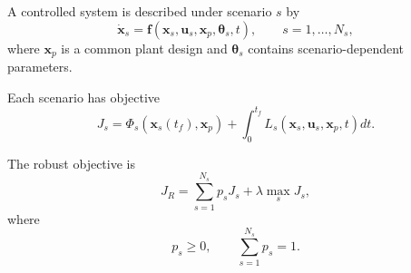 A controlled system is described under scenario $s$ by
\begin{equation}
\dot{\mathbf{x}}_s
=
\mathbf{f}
\left(
\mathbf{x}_s,
\mathbf{u}_s,
\mathbf{x}_p,
\boldsymbol{\theta}_s,
t
\right),
\qquad
s=1,\ldots,N_s,
\end{equation}
where $\mathbf{x}_p$ is a common plant design and
$\boldsymbol{\theta}_s$ contains scenario-dependent parameters.

Each scenario has objective
\begin{equation}
J_s
=
\Phi_s
\left(
\mathbf{x}_s(t_f),
\mathbf{x}_p
\right)
+
\int_0^{t_f}
L_s
\left(
\mathbf{x}_s,
\mathbf{u}_s,
\mathbf{x}_p,
t
\right)dt.
\end{equation}

The robust objective is
\begin{equation}
J_R
=
\sum_{s=1}^{N_s}p_sJ_s
+
\lambda
\max_{s}
J_s,
\end{equation}
where
\begin{equation}
p_s\geq0,
\qquad
\sum_{s=1}^{N_s}p_s=1.
\end{equation}

